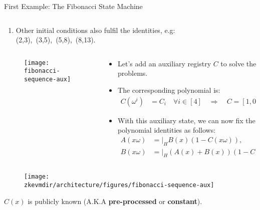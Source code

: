 \begin{frame}[allowframebreaks]{First Example: The Fibonacci State Machine}
\begin{columns}
\begin{column}{0.7\textwidth}
\begin{itemize}
\begin{enumerate}
The equations are not cyclic.
\item Other initial conditions also fulfil the identities, e.g:
(2,3),~(3,5),~(5,8),~(8,13).
\end{enumerate}
\end{itemize}
\end{column}
\end{columns}



\begin{columns}
\begin{column}{0.4\textwidth}
\begin{figure}
	\texttt{[image: fibonacci-sequence-aux]}
\end{figure}
\end{column}
\begin{column}{0.6\textwidth}
\begin{itemize}
\item Let's add an auxiliary registry $C$ to solve the problems.
\item The corresponding polynomial is:
\begin{align*}
C(\omega^i) &= C_i \quad \forall i \in [4] \quad \Longrightarrow \quad C = [1, 0, 0, 0].
\end{align*}
\item With this auxiliary state, we can now fix the polynomial identities as follows:
\begin{align*}
A(x\omega) &= \bigg\lvert_H  B(x)(1 - C(x\omega)), \\
B(x\omega) &= \bigg\lvert_H (A(x) + B(x))(1 - C(x\omega)) + C(x\omega).
\end{align*}
\end{itemize}
\end{column}
\end{columns}


\begin{columns}
\begin{column}{0.4\textwidth}
\begin{figure}
\texttt{[image: \\zkevmdir/architecture/figures/fibonacci-sequence-aux]}
\end{figure}
$C(x)$ is publicly known (A.K.A \textbf{pre-processed} or \textbf{constant}).
\end{column}


\end{columns}
\end{frame}
